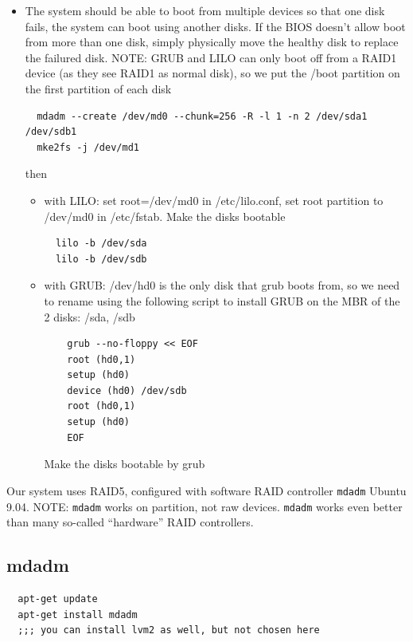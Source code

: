 \begin{itemize}
  \item The system should be able to boot from multiple devices so that one disk
  fails, the system can boot using another disks. If the BIOS doesn't allow boot
  from more than one disk, simply physically move the healthy disk to replace
  the failured disk. NOTE: GRUB and LILO can only boot off from a RAID1 device
  (as they see RAID1 as normal disk), so we put the /boot partition on the first
  partition of each disk
  \begin{verbatim}
  mdadm --create /dev/md0 --chunk=256 -R -l 1 -n 2 /dev/sda1 /dev/sdb1
  mke2fs -j /dev/md1
  \end{verbatim}
  then 
  \begin{itemize}
    \item with LILO: set root=/dev/md0 in /etc/lilo.conf, set root partition to
  /dev/md0 in /etc/fstab. Make the disks bootable 
  \begin{verbatim}
  lilo -b /dev/sda
  lilo -b /dev/sdb
  \end{verbatim}
    \item with GRUB:  /dev/hd0 is the only disk that grub boots from, so we
    need to rename using the following script to install GRUB on the MBR of the
    2 disks: /sda, /sdb
    \begin{verbatim}
    grub --no-floppy << EOF
    root (hd0,1)
    setup (hd0)
    device (hd0) /dev/sdb
    root (hd0,1)
    setup (hd0)
    EOF
    \end{verbatim}
    Make the disks bootable by grub
\end{itemize}  
\end{itemize}

Our system uses RAID5, configured with software RAID controller \verb!mdadm!
Ubuntu 9.04. NOTE:
\verb!mdadm! works on partition, not raw devices. \verb!mdadm! works even better
than many so-called ``hardware'' RAID controllers.

\subsection{mdadm}
\label{sec:mdadm}


\begin{verbatim}
  apt-get update
  apt-get install mdadm
  ;;; you can install lvm2 as well, but not chosen here
\end{verbatim}

